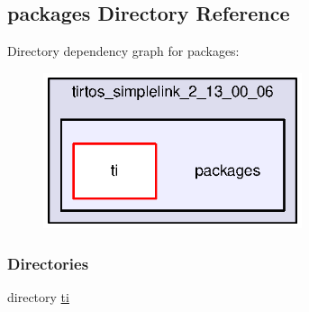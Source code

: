 \subsection{packages Directory Reference}
\label{dir_914ef8c92054fbd19b873011105ec041}
Directory dependency graph for packages\+:
\nopagebreak
\begin{figure}[H]
\begin{center}
\leavevmode
\includegraphics[width=215pt]{dir_914ef8c92054fbd19b873011105ec041_dep}
\end{center}
\end{figure}
\subsubsection*{Directories}
\begin{DoxyCompactItemize}
\item 
directory \hyperlink{dir_abd11468e5a5b51896344ba99410f96c}{ti}
\end{DoxyCompactItemize}
